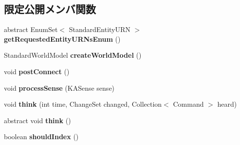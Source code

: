 \subsection*{限定公開メンバ関数}
\begin{DoxyCompactItemize}
\item 
\hypertarget{classadf_1_1agent_1_1Agent_a311ff9a9ad4a99ced51102f2083a7780}{}\label{classadf_1_1agent_1_1Agent_a311ff9a9ad4a99ced51102f2083a7780} 
abstract Enum\+Set$<$ Standard\+Entity\+U\+RN $>$ {\bfseries get\+Requested\+Entity\+U\+R\+Ns\+Enum} ()
\item 
\hypertarget{classadf_1_1agent_1_1Agent_aa6b4050401a515f48021b1813ea10688}{}\label{classadf_1_1agent_1_1Agent_aa6b4050401a515f48021b1813ea10688} 
Standard\+World\+Model {\bfseries create\+World\+Model} ()
\item 
\hypertarget{classadf_1_1agent_1_1Agent_ae831d47d081d9b343ec6c65e99de740f}{}\label{classadf_1_1agent_1_1Agent_ae831d47d081d9b343ec6c65e99de740f} 
void {\bfseries post\+Connect} ()
\item 
\hypertarget{classadf_1_1agent_1_1Agent_a69c3456b3351a085b5d959e6929cf2fe}{}\label{classadf_1_1agent_1_1Agent_a69c3456b3351a085b5d959e6929cf2fe} 
void {\bfseries process\+Sense} (K\+A\+Sense sense)
\item 
\hypertarget{classadf_1_1agent_1_1Agent_a747001153f5d19bc89d6aa5d343250a6}{}\label{classadf_1_1agent_1_1Agent_a747001153f5d19bc89d6aa5d343250a6} 
void {\bfseries think} (int time, Change\+Set changed, Collection$<$ Command $>$ heard)
\item 
\hypertarget{classadf_1_1agent_1_1Agent_aedd52af7190bca51de58f182aacc3cfe}{}\label{classadf_1_1agent_1_1Agent_aedd52af7190bca51de58f182aacc3cfe} 
abstract void {\bfseries think} ()
\item 
\hypertarget{classadf_1_1agent_1_1Agent_a20be2c96d7b14136d354a84f45067410}{}\label{classadf_1_1agent_1_1Agent_a20be2c96d7b14136d354a84f45067410} 
boolean {\bfseries should\+Index} ()
\end{DoxyCompactItemize}
